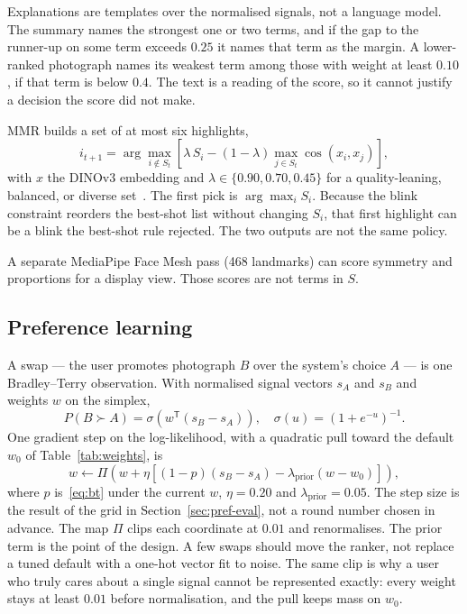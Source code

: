 \documentclass[conference]{IEEEtran}
\begin{document}
Explanations are templates over the normalised signals, not a language model.
The summary names the strongest one or two terms, and if the gap to the
runner-up on some term exceeds $0.25$ it names that term as the margin. A
lower-ranked photograph names its weakest term among those with weight at
least $0.10$, if that term is below $0.4$. The text is a reading of the score,
so it cannot justify a decision the score did not make.

MMR builds a set of at most six highlights,
\begin{equation}
i_{t+1}
=
\arg\max_{i\notin S_t}
\left[
\lambda\, S_i
-
(1-\lambda)
\max_{j\in S_t} \cos(x_i, x_j)
\right],
\label{eq:mmr}
\end{equation}
with $x$ the \mbox{DINOv3} embedding and $\lambda\in\{0.90, 0.70, 0.45\}$ for a
quality-leaning, balanced, or diverse set~\cite{carbonell1998mmr}. The first
pick is $\arg\max_i S_i$. Because the blink constraint reorders the best-shot
list without changing $S_i$, that first highlight can be a blink the best-shot
rule rejected. The two outputs are not the same policy.

A separate MediaPipe Face Mesh pass (468 landmarks) can score symmetry and
proportions for a display view. Those scores are not terms in $S$.

\subsection{Preference learning}
\label{sec:pref}

A swap --- the user promotes photograph $B$ over the system's choice $A$ ---
is one Bradley--Terry observation. With normalised signal vectors $s_A$ and
$s_B$ and weights $w$ on the simplex,
\begin{equation}
P(B \succ A) = \sigma\!\left(w^{\mathsf T}(s_B-s_A)\right),
\quad
\sigma(u)=(1+e^{-u})^{-1}.
\label{eq:bt}
\end{equation}
One gradient step on the log-likelihood, with a quadratic pull toward the
default $w_0$ of Table~\ref{tab:weights}, is
\begin{equation}
w
\leftarrow
\Pi\!\left(
w + \eta\left[
(1-p)(s_B-s_A)
-
\lambda_{\mathrm{prior}}(w-w_0)
\right]
\right),
\label{eq:sgd}
\end{equation}
where $p$ is~\eqref{eq:bt} under the current $w$, $\eta=0.20$ and
$\lambda_{\mathrm{prior}}=0.05$. The step size is the result of the grid in
Section~\ref{sec:pref-eval}, not a round number chosen in advance. The map $\Pi$ clips each coordinate at $0.01$
and renormalises. The prior term is the point of the design. A few swaps
should move the ranker, not replace a tuned default with a one-hot vector fit
to noise. The same clip is why a user who truly cares about a single signal
cannot be represented exactly: every weight stays at least $0.01$ before
normalisation, and the pull keeps mass on $w_0$.
\end{document}
